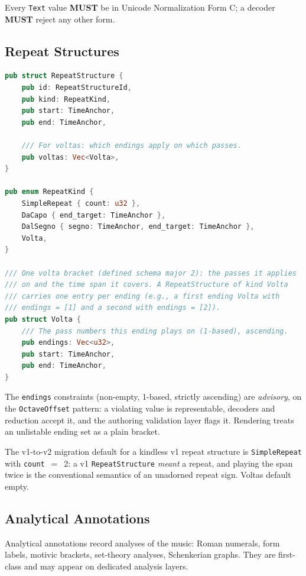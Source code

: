 \documentclass[11pt,letterpaper]{report}
\newcounter{requirement}[chapter]
\newcommand{\MUST}{\textbf{MUST}}
\begin{document}
\begin{requirement}
  \label{req:graph:text-nfc}
  Every \texttt{Text} value \MUST{} be in Unicode Normalization Form C; a
  decoder \MUST{} reject any other form.
\end{requirement}

\subsection{Repeat Structures}
\label{sec:graph:repeats}

\begin{lstlisting}[language=Rust]
pub struct RepeatStructure {
    pub id: RepeatStructureId,
    pub kind: RepeatKind,
    pub start: TimeAnchor,
    pub end: TimeAnchor,

    /// For voltas: which endings apply on which passes.
    pub voltas: Vec<Volta>,
}

pub enum RepeatKind {
    SimpleRepeat { count: u32 },
    DaCapo { end_target: TimeAnchor },
    DalSegno { segno: TimeAnchor, end_target: TimeAnchor },
    Volta,
}

/// One volta bracket (defined schema major 2): the passes it applies
/// on and the time span it covers. A RepeatStructure of kind Volta
/// carries one entry per ending (e.g., a first ending Volta with
/// endings = [1] and a second with endings = [2]).
pub struct Volta {
    /// The pass numbers this ending plays on (1-based), ascending.
    pub endings: Vec<u32>,
    pub start: TimeAnchor,
    pub end: TimeAnchor,
}
\end{lstlisting}

The \texttt{endings} constraints (non-empty, 1-based, strictly
ascending) are \emph{advisory}, on the \texttt{OctaveOffset} pattern:
a violating value is representable, decoders and reduction accept it,
and the authoring validation layer flags it. Rendering treats an
unlistable ending set as a plain bracket.

The v1-to-v2 migration default for a kindless v1 repeat structure is
\texttt{SimpleRepeat} with \texttt{count}~$=$~2: a v1
\texttt{RepeatStructure} \emph{meant} a repeat, and playing the span
twice is the conventional semantics of an unadorned repeat sign.
Voltas default empty.

\subsection{Analytical Annotations}

Analytical annotations record analyses of the music: Roman numerals,
form labels, motivic brackets, set-theory analyses, Schenkerian
graphs. They are first-class and may appear on dedicated analysis
layers.
\end{document}
